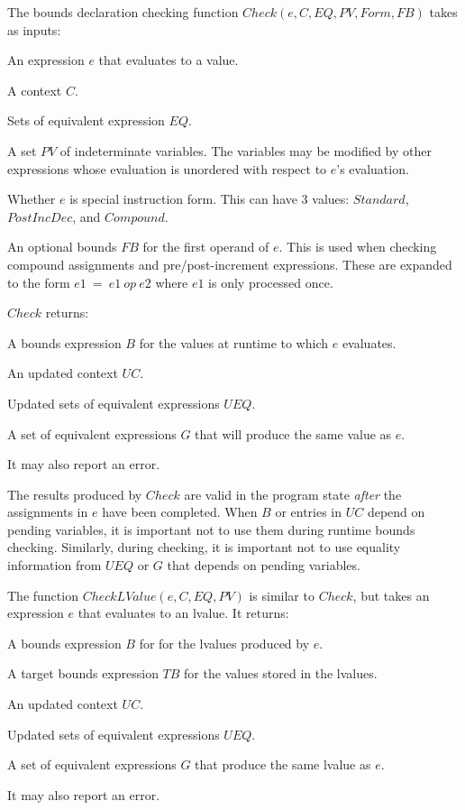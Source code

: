 The bounds declaration checking function $Check(e, C, EQ, PV, Form, FB)$ takes as inputs:
\begin{compactenum}
\item An expression $e$ that evaluates to a value.
\item A context $C$.
\item Sets of equivalent expression $EQ$.
\item A set $PV$ of indeterminate variables.  The variables 
may be modified by other expressions whose  evaluation is unordered with respect to $e$'s evaluation.
\item Whether $e$ is special instruction form.  This can have 3 values: $Standard$, $PostIncDec$,
and $Compound$.
\item An optional bounds $FB$ for the first operand of $e$.  
This is used when checking compound assignments and pre/post-increment expressions.  These are
expanded to the form $e1~=~e1~op~e2$ where $e1$ is only processed once. 
\end{compactenum}

$Check$ returns:
\begin{compactenum}
\item A bounds expression $B$ for the values at runtime to which $e$ evaluates.
\item An updated context $UC$.
\item Updated sets of equivalent expressions $UEQ$.
\item A set of equivalent expressions $G$ that will produce the same value as $e$. 
\item It may also report an error.
\end{compactenum}
The results produced by $Check$ are valid in the program state
{\em after} the assignments in $e$ have been completed.   When $B$ or entries in 
$UC$ depend on pending variables, it is important not to use them during runtime bounds checking.
Similarly, during checking, it is important not to use equality information
from $UEQ$ or $G$ that depends on pending variables.

The function $CheckLValue(e, C, EQ, PV)$ is similar to $Check$, but takes an
expression $e$ that evaluates to an lvalue.  It returns:
\begin{compactenum}
\item A bounds expression $B$ for for the lvalues produced by $e$.
\item A target bounds expression $TB$ for the values stored in the lvalues.
\item An updated context $UC$.
\item Updated sets of equivalent expressions $UEQ$.
\item A set of equivalent expressions $G$ that produce the same lvalue as $e$. 
\item It may also report an error.
\end{compactenum}

